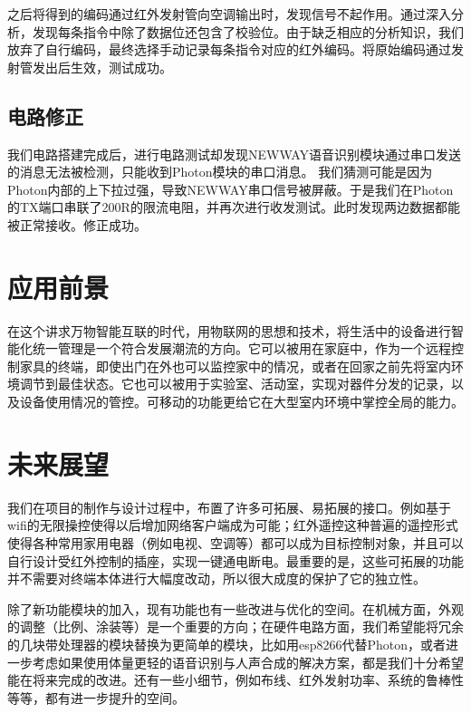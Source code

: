    \hspace{1.5em}之后将得到的编码通过红外发射管向空调输出时，发现信号不起作用。通过深入分析，发现每条指令中除了数据位还包含了校验位。由于缺乏相应的分析知识，我们放弃了自行编码，最终选择手动记录每条指令对应的红外编码。将原始编码通过发射管发出后生效，测试成功。

    \subsection{电路修正}
    \hspace{1.5em}我们电路搭建完成后，进行电路测试却发现NEWWAY语音识别模块通过串口发送的消息无法被检测，只能收到Photon模块的串口消息。
    \hspace{1.5em}我们猜测可能是因为Photon内部的上下拉过强，导致NEWWAY串口信号被屏蔽。于是我们在Photon的TX端口串联了200R的限流电阻，并再次进行收发测试。此时发现两边数据都能被正常接收。修正成功。

\newpage

\section{应用前景}
\hspace{1.5em}在这个讲求万物智能互联的时代，用物联网的思想和技术，将生活中的设备进行智能化统一管理是一个符合发展潮流的方向。它可以被用在家庭中，作为一个远程控制家具的终端，即使出门在外也可以监控家中的情况，或者在回家之前先将室内环境调节到最佳状态。它也可以被用于实验室、活动室，实现对器件分发的记录，以及设备使用情况的管控。可移动的功能更给它在大型室内环境中掌控全局的能力。

\section{未来展望}
\hspace{1.5em}我们在项目的制作与设计过程中，布置了许多可拓展、易拓展的接口。例如基于wifi的无限操控使得以后增加网络客户端成为可能；红外遥控这种普遍的遥控形式使得各种常用家用电器（例如电视、空调等）都可以成为目标控制对象，并且可以自行设计受红外控制的插座，实现一键通电断电。最重要的是，这些可拓展的功能并不需要对终端本体进行大幅度改动，所以很大成度的保护了它的独立性。

\hspace{1.5em}除了新功能模块的加入，现有功能也有一些改进与优化的空间。在机械方面，外观的调整（比例、涂装等）是一个重要的方向；在硬件电路方面，我们希望能将冗余的几块带处理器的模块替换为更简单的模块，比如用esp8266代替Photon，或者进一步考虑如果使用体量更轻的语音识别与人声合成的解决方案，都是我们十分希望能在将来完成的改进。还有一些小细节，例如布线、红外发射功率、系统的鲁棒性等等，都有进一步提升的空间。




